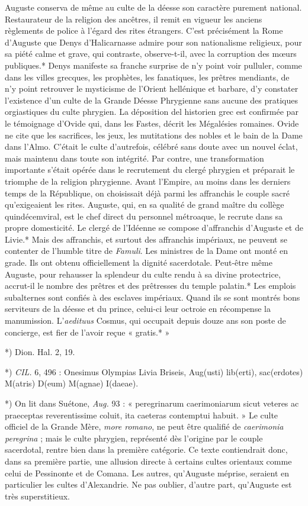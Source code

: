 \documentclass[a4paper, 11pt, oneside, polutonikogreek, french]{article}
\begin{document}
Auguste conserva de même au culte de la déesse son caractère purement national. Restaurateur de la religion des ancêtres, il remit en vigueur les anciens règlements de police à l'égard des rites étrangers. C'est précisément la Rome d'Auguste que Denys d'Halicarnasse admire pour son nationalisme religieux, pour sa piété calme et grave, qui contraste, observe-t-il, avec la corruption des mœurs publiques.* Denys manifeste sa franche surprise de n'y point voir pulluler, comme dans les villes grecques, les prophètes, les fanatiques, les prêtres mendiants, de n'y point retrouver le mysticisme de l'Orient hellénique et barbare, d'y constater l'existence d'un culte de la Grande Déesse Phrygienne sans aucune des pratiques orgiastiques du culte phrygien. La déposition del historien grec est confirmée par le témoignage d'Ovide qui, dans les Fastes, décrit les Mégalésies romaines. Ovide ne cite que les sacrifices, les jeux, les mutitations des nobles et le bain de la Dame dans l'Almo. C'était le culte d'autrefois, célébré sans doute avec un nouvel éclat, mais maintenu dans toute son intégrité. Par contre, une transformation importante s'était opérée dans le recrutement du clergé phrygien et préparait le triomphe de la religion phrygienne. Avant l'Empire, au moins dans les derniers temps de la République, on choisissait déjà parmi les affranchis le couple sacré qu'exigeaient les rites. Auguste, qui, en sa qualité de grand maître du collège quindécemviral, est le chef direct du personnel métroaque, le recrute dans sa propre domesticité. Le clergé de l'Idéenne se compose d'affranchis d'Auguste et de Livie.* Mais des affranchis, et surtout des affranchis impériaux, ne peuvent se contenter de l'humble titre de \emph{Famuli}. Les ministres de la Dame ont monté en grade. Ils ont obtenu officiellement la dignité sacerdotale. Peut-être même Auguste, pour rehausser la splendeur du culte rendu à sa divine protectrice, accrut-il le nombre des prêtres et des prêtresses du temple palatin.* Les emplois subalternes sont confiés à des esclaves impériaux. Quand ils se sont montrés bons serviteurs de la déesse et du prince, celui-ci leur octroie en récompense la manumission. L'\emph{aedituus} Cosmus, qui occupait depuis douze ans son poste de concierge, est fier de l'avoir reçue « gratis.* »

*) Dion. Hal. 2, 19.

*) \emph{CIL.} 6, 496 : Onesimus Olympias Livia Briseis, Aug(usti) lib(erti), sac(erdotes) M(atris) D(eum) M(agnae) I(daeae).

*) On lit dans Suétone, \emph{Aug.} 93 : « peregrinarum caerimoniarum sicut veteres ac praeceptas reverentissime coluit, ita caeteras contemptui habuit. » Le culte officiel de la Grande Mère, \emph{more romano}, ne peut être qualifié de \emph{caerimonia peregrina} ; mais le culte phrygien, représenté dès l'origine par le couple sacerdotal, rentre bien dans la première catégorie. Ce texte contiendrait donc, dans sa première partie, une allusion directe à certains cultes orientaux comme celui de Pessinonte et de Comana. Les autres, qu'Auguste méprise, seraient en particulier les cultes d'Alexandrie. Ne pas oublier, d'autre part, qu'Auguste est très superstitieux.
\end{document}
